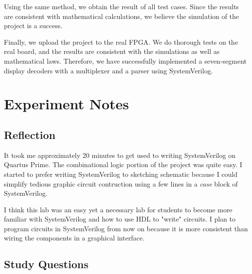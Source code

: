 \documentclass[12pt]{article}
\begin{document}
Using the same method, we obtain the result of all test cases. Since the results are consistent with mathematical calculations, we believe the simulation of the project is a success.

Finally, we upload the project to the real FPGA. We do thorough tests on the real board, and the results are consistent with the simulations as well as mathematical laws. Therefore, we have successfully implemented a seven-segment display decoders with a multiplexer and a parser using SystemVerilog.

\section{Experiment Notes}

\subsection*{Reflection}

It took me approximately 20 minutes to get used to writing SystemVerilog on Quartus Prime. The combinational logic portion of the project was quite easy. I started to prefer writing SystemVerilog to sketching schematic because I could simplify tedious graphic circuit contruction using a few lines in a \textit{case} block of SystemVerilog.

I think this lab was an easy yet a necessary lab for students to become more familiar with SystemVerilog and how to use HDL to "write" circuits. I plan to program circuits in SystemVerilog from now on because it is more consistent than wiring the components in a graphical interface.

\subsection*{Study Questions}
\end{document}
